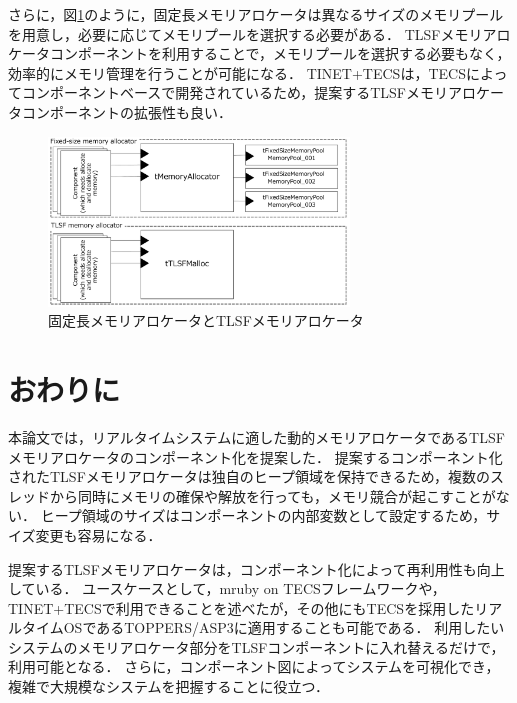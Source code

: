 \documentclass[submit,techrep]{ipsj_v2/UTF8/ipsj}
\begin{document}
さらに，図\ref{fig:UseCase_TINET}のように，固定長メモリアロケータは異なるサイズのメモリプールを用意し，必要に応じてメモリプールを選択する必要がある．
TLSFメモリアロケータコンポーネントを利用することで，メモリプールを選択する必要もなく，効率的にメモリ管理を行うことが可能になる．
TINET+TECSは，TECSによってコンポーネントベースで開発されているため，提案するTLSFメモリアロケータコンポーネントの拡張性も良い．

\begin{figure}[t]
    \centering
    \includegraphics[width=8cm,clip]{figure/UseCase_TINET.pdf}
    \caption{固定長メモリアロケータとTLSFメモリアロケータ}
    \label{fig:UseCase_TINET}
\end{figure}
    


\section{おわりに}
\label{sec:Conclusion}

本論文では，リアルタイムシステムに適した動的メモリアロケータであるTLSFメモリアロケータのコンポーネント化を提案した．
提案するコンポーネント化されたTLSFメモリアロケータは独自のヒープ領域を保持できるため，複数のスレッドから同時にメモリの確保や解放を行っても，メモリ競合が起こすことがない．
ヒープ領域のサイズはコンポーネントの内部変数として設定するため，サイズ変更も容易になる．

提案するTLSFメモリアロケータは，コンポーネント化によって再利用性も向上している．
ユースケースとして，mruby on TECSフレームワークや，TINET+TECSで利用できることを述べたが，その他にもTECSを採用したリアルタイムOSであるTOPPERS/ASP3\cite{par:ASP3}に適用することも可能である．
利用したいシステムのメモリアロケータ部分をTLSFコンポーネントに入れ替えるだけで，利用可能となる．
さらに，コンポーネント図によってシステムを可視化でき，複雑で大規模なシステムを把握することに役立つ．
\end{document}
